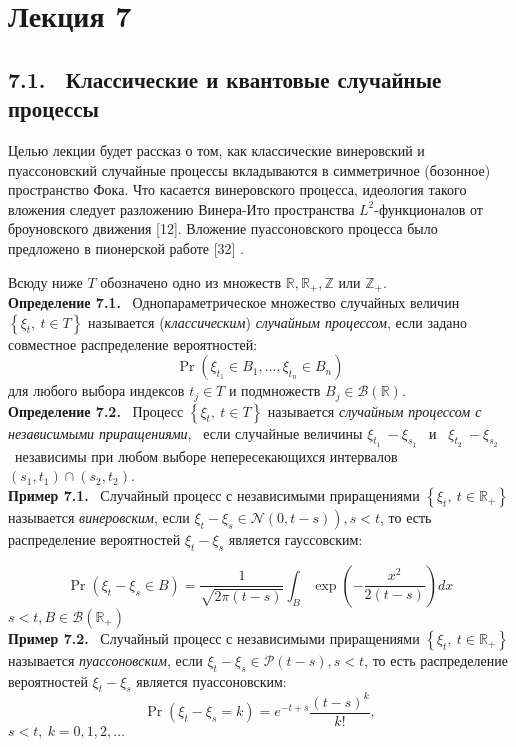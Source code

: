 \documentclass[a5paper, 16pt]{book}
\date{23.03.2023}
\author{Юрий Дударь}
\begin{document}
\section*{Лекция 7}
\subsection*{7.1. \ Классические и квантовые случайные процессы}
Целью лекции будет рассказ о том, как классические винеровский и пуассоновский случайные процессы вкладываются в симметричное (бозонное) пространство Фока. Что касается винеровского процесса, идеология такого вложения следует разложению Винера-Ито пространства $L^{2}$-функционалов от броуновского движения [12]. Вложение пуассоновского процесса было предложено в пионерской работе [32] .

Всюду ниже $T$ обозначено одно из множеств $\mathbb{R}, \mathbb{R}_{+}, \mathbb{Z}$ или $\mathbb{Z}_{+}$.\\

\noindent\textbf{Определение 7.1.} \ Однопараметрическое множество случайных величин $\left\{\xi_{t}, \ t \in T\right\}$ называется (\textit{классическим}) \textit{случайным процессом}, если задано совместное распределение вероятностей:
$$\operatorname{Pr}\left(\xi_{t_{1}} \in B_{1}, \ldots, \xi_{t_{n}} \in B_{n}\right)$$ для любого выбора индексов $t_{j} \in T$ и подмножеств $B_{j} \in \mathcal{B}(\mathbb{R})$.\\

\noindent\textbf{Определение 7.2.} \ Процесс $\left\{\xi_{t}, \ t \in T\right\}$ называется \textit{случайным процессом с независимыми приращениями}, \ если случайные величины $\xi_{t_{1}} \ -\xi_{s_{1}}$ \ и \ $\xi_{t_{2}} \ -\xi_{s_{2}}$ \ независимы при любом выборе непересекающихся интервалов $\left(s_{1}, t_{1}\right) \cap\left(s_{2}, t_{2}\right)$.\\

\noindent\textbf{Пример 7.1.} \ Случайный процесс с независимыми приращениями $\left\{\xi_{t}, \ t \in \mathbb{R}_{+}\right\} \ $называется \textit{винеровским}, если $\left.\xi_{t}-\xi_{s} \in \mathcal{N}(0, t-s)\right), s<t$, то есть распределение вероятностей $\xi_{t}-\xi_{s}$ является гауссовским:

$$\operatorname{Pr}\left(\xi_{t}-\xi_{s} \in B\right)=\frac{1}{\sqrt{2 \pi(t-s)}} \int_{B} \exp \left(-\frac{x^{2}}{2(t-s)}\right) d x$$ $s<t, B \in \mathcal{B}\left(\mathbb{R}_{+}\right)$\\

\noindent\textbf{Пример 7.2.} \ Случайный процесс с независимыми приращениями $\left\{\xi_{t}, \ t \in \mathbb{R}_{+}\right\} \ $называется \textit{пуассоновским}, если $\xi_{t}-\xi_{s} \in \mathcal{P}(t-s), s<t$, то есть распределение вероятностей $\xi_{t}-\xi_{s}$ является пуассоновским:
$$\operatorname{Pr}\left(\xi_{t}-\xi_{s}=k\right)=e^{-t+s} \frac{(t-s)^{k}}{k !},$$ $s<t, \ k=0,1,2, \ldots$ 
\end{document}
